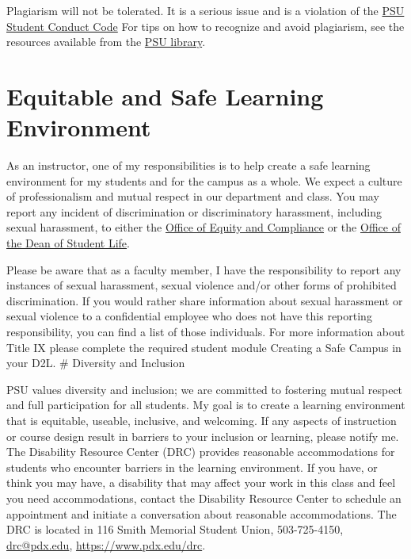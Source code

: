 \documentclass[11pt,]{article}
\begin{document}
Plagiarism will not be tolerated. It is a serious issue and is a
violation of the
\href{https://www.pdx.edu/dos/psu-student-code-conduct}{PSU Student
Conduct Code} For tips on how to recognize and avoid plagiarism, see the
resources available from the
\href{https://library.pdx.edu/diy/avoid-plagiarism}{PSU library}.

\section{Equitable and Safe Learning
Environment}\label{equitable-and-safe-learning-environment}

As an instructor, one of my responsibilities is to help create a safe
learning environment for my students and for the campus as a whole. We
expect a culture of professionalism and mutual respect in our department
and class. You may report any incident of discrimination or
discriminatory harassment, including sexual harassment, to either the
\href{https://www.pdx.edu/diversity/office-of-equity-compliance}{Office
of Equity and Compliance} or the \href{https://www.pdx.edu/dos/}{Office
of the Dean of Student Life}.

Please be aware that as a faculty member, I have the responsibility to
report any instances of sexual harassment, sexual violence and/or other
forms of prohibited discrimination. If you would rather share
information about sexual harassment or sexual violence to a confidential
employee who does not have this reporting responsibility, you can find a
list of those individuals. For more information about Title IX please
complete the required student module Creating a Safe Campus in your D2L.
\# Diversity and Inclusion

PSU values diversity and inclusion; we are committed to fostering mutual
respect and full participation for all students. My goal is to create a
learning environment that is equitable, useable, inclusive, and
welcoming. If any aspects of instruction or course design result in
barriers to your inclusion or learning, please notify me. The Disability
Resource Center (DRC) provides reasonable accommodations for students
who encounter barriers in the learning environment. If you have, or
think you may have, a disability that may affect your work in this class
and feel you need accommodations, contact the Disability Resource Center
to schedule an appointment and initiate a conversation about reasonable
accommodations. The DRC is located in 116 Smith Memorial Student Union,
503-725-4150, \url{drc@pdx.edu}, \url{https://www.pdx.edu/drc}.
\end{document}
